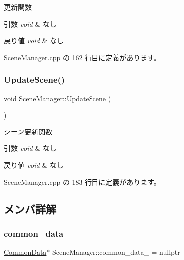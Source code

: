 更新関数 


\begin{DoxyParams}{引数}
{\em void} & なし \\
\hline
\end{DoxyParams}

\begin{DoxyRetVals}{戻り値}
{\em void} & なし \\
\hline
\end{DoxyRetVals}


 Scene\+Manager.\+cpp の 162 行目に定義があります。

\mbox{\label{class_scene_manager_a493bc0d65558ce004f6f248a185ba956}} 
\subsubsection{\texorpdfstring{Update\+Scene()}{UpdateScene()}}
{\footnotesize\ttfamily void Scene\+Manager\+::\+Update\+Scene (\begin{DoxyParamCaption}{ }\end{DoxyParamCaption})}



シーン更新関数 


\begin{DoxyParams}{引数}
{\em void} & なし \\
\hline
\end{DoxyParams}

\begin{DoxyRetVals}{戻り値}
{\em void} & なし \\
\hline
\end{DoxyRetVals}


 Scene\+Manager.\+cpp の 183 行目に定義があります。



\subsection{メンバ詳解}
\mbox{\label{class_scene_manager_a5f0f0da3d7f9a8a94f0b5a20c3a4908a}} 
\subsubsection{\texorpdfstring{common\+\_\+data\+\_\+}{common\_data\_}}
{\footnotesize\ttfamily \mbox{\hyperlink{class_scene_manager_1_1_common_data}{Common\+Data}}$\ast$ Scene\+Manager\+::common\+\_\+data\+\_\+ = nullptr\hspace{0.3cm}{\ttfamily [private]}}



